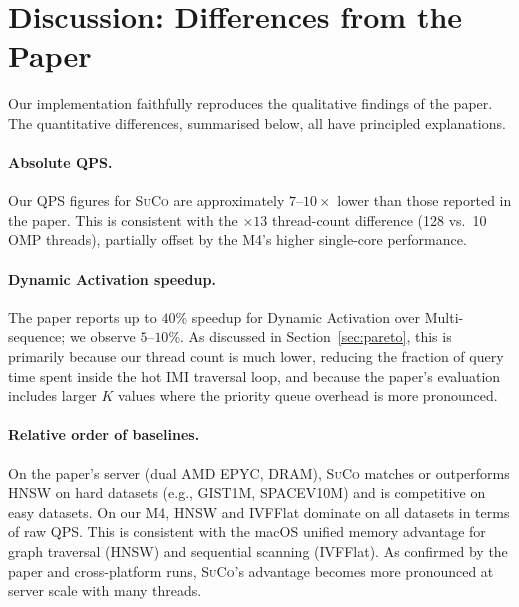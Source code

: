 \documentclass[11pt,a4paper]{article}
\newcommand{\suco}{\textsc{SuCo}}
\begin{document}
\section{Discussion: Differences from the Paper}

Our implementation faithfully reproduces the qualitative findings of the
paper.  The quantitative differences, summarised below, all have principled
explanations.

\paragraph{Absolute QPS.}
Our QPS figures for \suco{} are approximately $7$--$10\times$ lower than
those reported in the paper.  This is consistent with the
$\times 13$ thread-count difference (128 vs.\ 10 OMP threads), partially
offset by the M4's higher single-core performance.

\paragraph{Dynamic Activation speedup.}
The paper reports up to $40\%$ speedup for Dynamic Activation over
Multi-sequence; we observe $5$--$10\%$.  As discussed in
Section~\ref{sec:pareto}, this is primarily because our thread count is much
lower, reducing the fraction of query time spent inside the hot IMI traversal
loop, and because the paper's evaluation includes larger $K$ values where the
priority queue overhead is more pronounced.

\paragraph{Relative order of baselines.}
On the paper's server (dual AMD EPYC, DRAM), \suco{} matches or outperforms
HNSW on hard datasets (e.g., GIST1M, SPACEV10M) and is competitive on easy
datasets.  On our M4, HNSW and IVFFlat dominate on all datasets in terms of
raw QPS.  This is consistent with the macOS unified memory advantage for
graph traversal (HNSW) and sequential scanning (IVFFlat).  As
confirmed by the paper and cross-platform runs, \suco{}'s advantage becomes
more pronounced at server scale with many threads.
\end{document}
